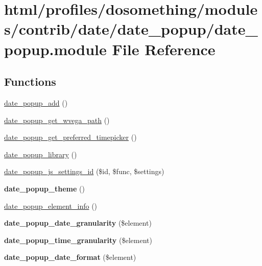 \hypertarget{date__popup_8module}{
\section{html/profiles/dosomething/modules/contrib/date/date\_\-popup/date\_\-popup.module File Reference}
\label{date__popup_8module}
}
\subsection*{Functions}
\begin{DoxyCompactItemize}
\item 
\hyperlink{date__popup_8module_a060827559885c3a2052e96d116f24f69}{date\_\-popup\_\-add} ()
\item 
\hyperlink{date__popup_8module_abef7f63b1aaef535f22f89f2756c2e9c}{date\_\-popup\_\-get\_\-wvega\_\-path} ()
\item 
\hyperlink{date__popup_8module_a199bd599cff3bfafca2ba101347867e1}{date\_\-popup\_\-get\_\-preferred\_\-timepicker} ()
\item 
\hyperlink{date__popup_8module_af4c7a08e45fc8c75254a468d27d9bbfa}{date\_\-popup\_\-library} ()
\item 
\hyperlink{date__popup_8module_a8077608506edf747245df8c1192706c8}{date\_\-popup\_\-js\_\-settings\_\-id} (\$id, \$func, \$settings)
\item 
\hypertarget{date__popup_8module_a3aef1fed0b5c3ed53c959f8a070fc75a}{
{\bfseries date\_\-popup\_\-theme} ()}
\label{date__popup_8module_a3aef1fed0b5c3ed53c959f8a070fc75a}

\item 
\hyperlink{date__popup_8module_a0ba42c20b0a9b00949c0d480f2f67fb7}{date\_\-popup\_\-element\_\-info} ()
\item 
\hypertarget{date__popup_8module_a0e13f711d602e3db1b8ef65f3b107e35}{
{\bfseries date\_\-popup\_\-date\_\-granularity} (\$element)}
\label{date__popup_8module_a0e13f711d602e3db1b8ef65f3b107e35}

\item 
\hypertarget{date__popup_8module_a4050985b5579f909b6cfc4a8e85c77e8}{
{\bfseries date\_\-popup\_\-time\_\-granularity} (\$element)}
\label{date__popup_8module_a4050985b5579f909b6cfc4a8e85c77e8}

\item 
\hypertarget{date__popup_8module_aee3acb5ec550f456ba53ce82efcbafd6}{
{\bfseries date\_\-popup\_\-date\_\-format} (\$element)}
\label{date__popup_8module_aee3acb5ec550f456ba53ce82efcbafd6}


\end{DoxyCompactItemize}
